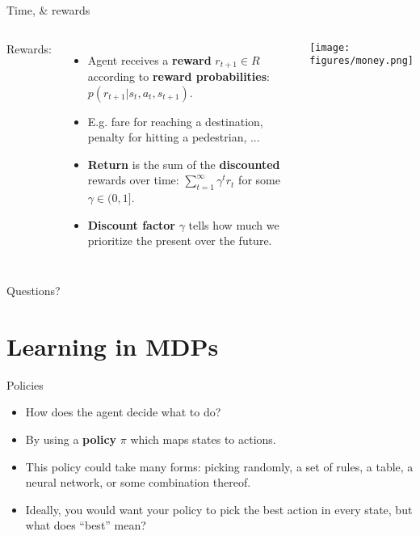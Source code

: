 \documentclass[handout]{beamer} %
\begin{document}
\begin{frame}{Time, \& rewards}
\begin{columns}
Rewards:
\begin{itemize}
    \item Agent receives a \textbf{reward} \(r_{t+1} \in R\) according to \textbf{reward probabilities}: \(p(r_{t+1} | s_t, a_t, s_{t+1})\). 
    \item<2-> E.g. fare for reaching a destination, penalty for hitting a pedestrian, ...
    \item<3-> \textbf{Return} is the sum of the \textbf{discounted} rewards over time: \(\sum_{t=1}^\infty \gamma^t r_t\) for some \(\gamma \in (0, 1]\).
    \item<4-> \textbf{Discount factor} \(\gamma\) tells how much we prioritize the present over the future.
\end{itemize}
    \begin{center}
    \texttt{[image: figures/money.png]}
    \end{center}
\end{columns}
\end{frame}


\begin{frame}[standout]
Questions?
\end{frame}

\section{Learning in MDPs}
\begin{frame}{Policies}
\begin{itemize}
\item How does the agent decide what to do?
\item<2-> By using a \textbf{policy} \(\pi\) which maps states to actions.
\item<3-> This policy could take many forms: picking randomly, a set of rules, a table, a neural network, or some combination thereof.
\item<4-> Ideally, you would want your policy to pick the best action in every state, but what does ``best'' mean?
\end{itemize}
\end{frame}
\end{document}
